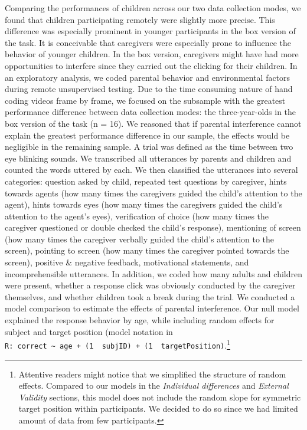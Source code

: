 \documentclass[
  man,floatsintext]{apa6}
\begin{document}
Comparing the performances of children across our two data collection modes, we found that children participating remotely were slightly more precise. This difference was especially prominent in younger participants in the box version of the task. It is conceivable that caregivers were especially prone to influence the behavior of younger children. In the box version, caregivers might have had more opportunities to interfere since they carried out the clicking for their children.
In an exploratory analysis, we coded parental behavior and environmental factors during remote unsupervised testing. Due to the time consuming nature of hand coding videos frame by frame, we focused on the subsample with the greatest performance difference between data collection modes: the three-year-olds in the box version of the task (n = 16). We reasoned that if parental interference cannot explain the greatest performance difference in our sample, the effects would be negligible in the remaining sample.
A trial was defined as the time between two eye blinking sounds. We transcribed all utterances by parents and children and counted the words uttered by each. We then classified the utterances into several categories: question asked by child, repeated test questions by caregiver, hints towards agents (how many times the caregivers guided the child's attention to the agent), hints towards eyes (how many times the caregivers guided the child's attention to the agent's eyes), verification of choice (how many times the caregiver questioned or double checked the child's response), mentioning of screen (how many times the caregiver verbally guided the child's attention to the screen), pointing to screen (how many times the caregiver pointed towards the screen), positive \& negative feedback, motivational statements, and incomprehensible utterances.
In addition, we coded how many adults and children were present, whether a response click was obviously conducted by the caregiver themselves, and whether children took a break during the trial.
We conducted a model comparison to estimate the effects of parental interference. Our null model explained the response behavior by age, while including random effects for subject and target position (model notation in \texttt{R:\ correct\ \textasciitilde{}\ age\ +\ (1\ \textbar{}\ subjID)\ +\ (1\ \textbar{}\ targetPosition)}.\footnote{Attentive readers might notice that we simplified the structure of random effects. Compared to our models in the \emph{Individual differences} and \emph{External Validity} sections, this model does not include the random slope for symmetric target position within participants. We decided to do so since we had limited amount of data from few participants.}
\end{document}
